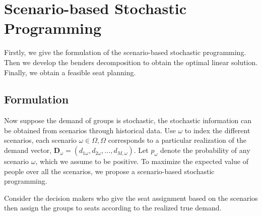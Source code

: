 
\section{Scenario-based Stochastic Programming}
Firstly, we give the formulation of the scenario-based stochastic programming. Then we develop the benders decomposition to obtain the optimal linear solution. Finally, we obtain a feasible seat planning. 

\subsection{Formulation}

Now suppose the demand of groups is stochastic, the stochastic information can be obtained from scenarios through historical data. Use $\omega$ to index the different scenarios, each scenario $\omega \in \Omega, \Omega$ corresponds to a particular realization of the demand vector, $\mathbf{D}_\omega = (d_{1\omega},d_{2\omega},\ldots,d_{M,\omega})$. Let $p_{\omega}$ denote the probability of any scenario $\omega$, which we assume to be positive. To maximize the expected value of people over all the scenarios, we propose a scenario-based stochastic programming.

Consider the decision makers who give the seat assignment based on the scenarios then assign the groups to seats according to the realized true demand. 


